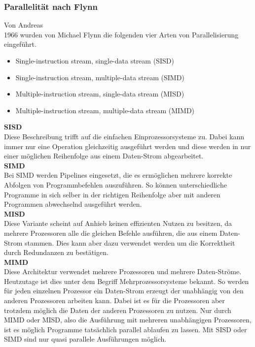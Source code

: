 \documentclass[12pt]{article}
\begin{document}
\subsubsection{Parallelität nach Flynn}
Von Andreas\\
1966 wurden von Michael Flynn die folgenden vier Arten von Parallelisierung eingeführt. \cite{Flynn}

\begin{itemize}
\item Single-instruction stream, single-data stream (SISD)
\item Single-instruction stream, multiple-data stream (SIMD)
\item Multiple-instruction stream, single-data stream (MISD)
\item Multiple-instruction stream, multiple-data stream (MIMD)
\end{itemize}

\noindent
\textbf{SISD}\\
Diese Beschreibung trifft auf die einfachen Einprozessorsysteme zu. Dabei kann immer nur eine Operation gleichzeitig ausgeführt werden und diese werden in nur einer möglichen Reihenfolge aus einem Daten-Strom abgearbeitet.\\

\noindent
\textbf{SIMD}\\
Bei SIMD werden Pipelines eingesetzt, die es ermöglichen mehrere korrekte Abfolgen von Programmbefehlen auszuführen. So können unterschiedliche Programme in sich selber in der richtigen Reihenfolge aber mit anderen Programmen abwechselnd ausgeführt werden.\\

\noindent
\textbf{MISD}\\
Diese Variante scheint auf Anhieb keinen effizienten Nutzen zu besitzen, da mehrere Prozessoren alle die gleichen Befehle ausführen, die aus einem Daten-Strom stammen. Dies kann aber dazu verwendet werden um die Korrektheit durch Redundanzen zu bestätigen. \\

\noindent
\textbf{MIMD}\\
Diese Architektur verwendet mehrere Prozessoren und mehrere Daten-Ströme. Heutzutage ist dies unter dem Begriff Mehrprozessorsysteme bekannt. So werden für jeden einzelnen Prozessor ein Daten-Strom erzeugt der unabhängig von den anderen Prozessoren arbeiten kann. Dabei ist es für die Prozessoren aber trotzdem möglich die Daten der anderen Prozessoren zu nutzen. Nur durch MIMD oder MISD, also die Ausführung mit mehreren unabhängigen Prozessoren, ist es möglich Programme tatsächlich parallel ablaufen zu lassen. Mit SISD oder SIMD sind nur quasi parallele Ausführungen möglich.\\
\end{document}
